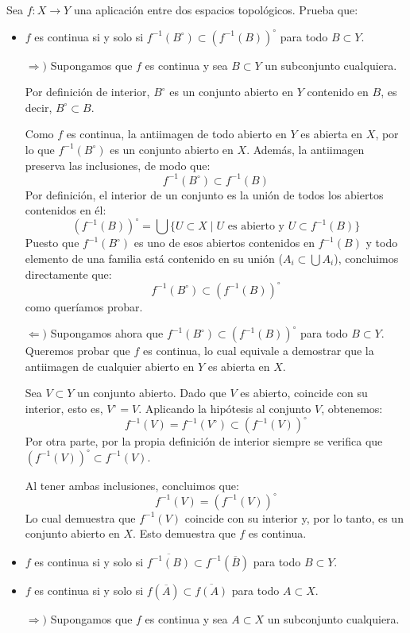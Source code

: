 \begin{ejer}
    [91 a), c), e)] Sea $f : X \longrightarrow Y$ una aplicación entre dos espacios topológicos. Prueba que:
    \begin{itemize}
        \item[a)] $f$ es continua si y solo si $f^{-1}(B^{\circ}) \subset \left(f^{-1}(B)\right)^{\circ}$ para todo $B \subset Y$.
\begin{sol}
    $\Rightarrow)$ Supongamos que $f$ es continua y sea $B \subset Y$ un subconjunto cualquiera.

    Por definición de interior, $B^{\circ}$ es un conjunto abierto en $Y$ contenido en $B$, es decir, $B^{\circ} \subset B$.
    
    Como $f$ es continua, la antiimagen de todo abierto en $Y$ es abierta en $X$, por lo que $f^{-1}(B^{\circ})$ es un conjunto abierto en $X$. Además, la antiimagen preserva las inclusiones, de modo que:
    \[
        f^{-1}(B^{\circ}) \subset f^{-1}(B)
    \]
    Por definición, el interior de un conjunto es la unión de todos los abiertos contenidos en él:
    \[
        \left(f^{-1}(B)\right)^{\circ} = \bigcup \{ U \subset X \mid U \text{ es abierto y } U \subset f^{-1}(B) \}
    \]
    Puesto que $f^{-1}(B^{\circ})$ es uno de esos abiertos contenidos en $f^{-1}(B)$ y todo elemento de una familia está contenido en su unión ($A_i \subset \bigcup A_i$), concluimos directamente que:
    \[
        f^{-1}(B^{\circ}) \subset \left(f^{-1}(B)\right)^{\circ}
    \]
    como queríamos probar.

    \medskip

    $\Leftarrow)$ Supongamos ahora que $f^{-1}(B^{\circ}) \subset \left(f^{-1}(B)\right)^{\circ}$ para todo $B \subset Y$. Queremos probar que $f$ es continua, lo cual equivale a demostrar que la antiimagen de cualquier abierto en $Y$ es abierta en $X$.

    Sea $V \subset Y$ un conjunto abierto. Dado que $V$ es abierto, coincide con su interior, esto es, $V^{\circ} = V$. Aplicando la hipótesis al conjunto $V$, obtenemos:
    \[
        f^{-1}(V) = f^{-1}(V^{\circ}) \subset \left(f^{-1}(V)\right)^{\circ}
    \]
    Por otra parte, por la propia definición de interior siempre se verifica que $\left(f^{-1}(V)\right)^{\circ} \subset f^{-1}(V)$.

    Al tener ambas inclusiones, concluimos que:
    \[
        f^{-1}(V) = \left(f^{-1}(V)\right)^{\circ}
    \]
    Lo cual demuestra que $f^{-1}(V)$ coincide con su interior y, por lo tanto, es un conjunto abierto en $X$. Esto demuestra que $f$ es continua.
\end{sol}
        \item[b)] $f$ es continua si y solo si $\overline{f^{-1}(B)} \subset f^{-1} (\overline{B})$ para todo $B \subset Y$. 
        \item[c)] $f$ es continua si y solo si $f(\overline{A}) \subset \overline{f(A)}$ para todo $A \subset X$.
\begin{sol}
    $\Rightarrow)$ Supongamos que $f$ es continua y sea $A \subset X$ un subconjunto cualquiera. 
    

\end{sol}
\end{itemize}
\end{ejer}
